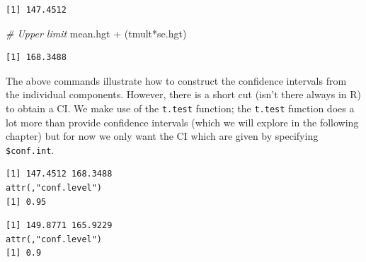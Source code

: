 \documentclass[
  oneside]{krantz}
\newenvironment{Shaded}{\begin{snugshade}}{\end{snugshade}}
\newcommand{\AttributeTok}[1]{\textcolor[rgb]{0.77,0.63,0.00}{#1}}
\newcommand{\CommentTok}[1]{\textcolor[rgb]{0.56,0.35,0.01}{\textit{#1}}}
\newcommand{\FloatTok}[1]{\textcolor[rgb]{0.00,0.00,0.81}{#1}}
\newcommand{\FunctionTok}[1]{\textcolor[rgb]{0.00,0.00,0.00}{#1}}
\newcommand{\NormalTok}[1]{#1}
\newcommand{\SpecialCharTok}[1]{\textcolor[rgb]{0.00,0.00,0.00}{#1}}
\begin{document}
\begin{verbatim}
[1] 147.4512
\end{verbatim}

\begin{Shaded}
\begin{Highlighting}[]
\CommentTok{\# Upper limit}
\NormalTok{mean.hgt }\SpecialCharTok{+}\NormalTok{ (tmult}\SpecialCharTok{*}\NormalTok{se.hgt)}
\end{Highlighting}
\end{Shaded}

\begin{verbatim}
[1] 168.3488
\end{verbatim}

The above commands illustrate how to construct the confidence intervals from the individual components. However, there is a short cut (isn't there always in R) to obtain a CI. We make use of the \texttt{t.test} function; the \texttt{t.test} function does a lot more than provide confidence intervals (which we will explore in the following chapter) but for now we only want the CI which are given by specifying \texttt{\$conf.int}.

\begin{Shaded}
\end{Shaded}

\begin{verbatim}
[1] 147.4512 168.3488
attr(,"conf.level")
[1] 0.95
\end{verbatim}

\begin{Shaded}
\end{Shaded}

\begin{verbatim}
[1] 149.8771 165.9229
attr(,"conf.level")
[1] 0.9
\end{verbatim}

\begin{Shaded}
\end{Shaded}
\end{document}
